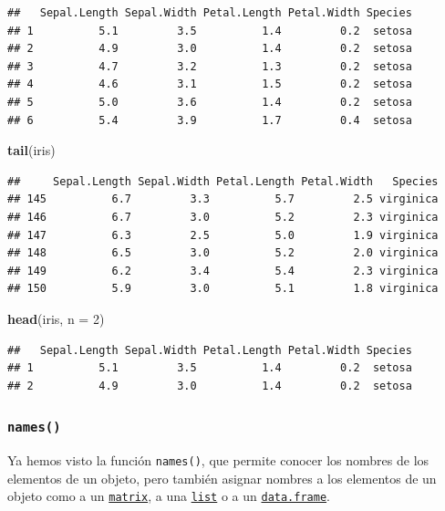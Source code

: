 \documentclass[]{book}
\newenvironment{Shaded}{\begin{snugshade}}{\end{snugshade}}
\newcommand{\KeywordTok}[1]{\textcolor[rgb]{0.13,0.29,0.53}{\textbf{#1}}}
\newcommand{\DataTypeTok}[1]{\textcolor[rgb]{0.13,0.29,0.53}{#1}}
\newcommand{\DecValTok}[1]{\textcolor[rgb]{0.00,0.00,0.81}{#1}}
\newcommand{\NormalTok}[1]{#1}
\begin{document}
\begin{verbatim}
##   Sepal.Length Sepal.Width Petal.Length Petal.Width Species
## 1          5.1         3.5          1.4         0.2  setosa
## 2          4.9         3.0          1.4         0.2  setosa
## 3          4.7         3.2          1.3         0.2  setosa
## 4          4.6         3.1          1.5         0.2  setosa
## 5          5.0         3.6          1.4         0.2  setosa
## 6          5.4         3.9          1.7         0.4  setosa
\end{verbatim}

\begin{Shaded}
\begin{Highlighting}[]
\KeywordTok{tail}\NormalTok{(iris)}
\end{Highlighting}
\end{Shaded}

\begin{verbatim}
##     Sepal.Length Sepal.Width Petal.Length Petal.Width   Species
## 145          6.7         3.3          5.7         2.5 virginica
## 146          6.7         3.0          5.2         2.3 virginica
## 147          6.3         2.5          5.0         1.9 virginica
## 148          6.5         3.0          5.2         2.0 virginica
## 149          6.2         3.4          5.4         2.3 virginica
## 150          5.9         3.0          5.1         1.8 virginica
\end{verbatim}

\begin{Shaded}
\begin{Highlighting}[]
\KeywordTok{head}\NormalTok{(iris, }\DataTypeTok{n =} \DecValTok{2}\NormalTok{)}
\end{Highlighting}
\end{Shaded}

\begin{verbatim}
##   Sepal.Length Sepal.Width Petal.Length Petal.Width Species
## 1          5.1         3.5          1.4         0.2  setosa
## 2          4.9         3.0          1.4         0.2  setosa
\end{verbatim}

\subsubsection{\texorpdfstring{\texttt{names()}}{names()}}\label{l015names}

Ya hemos visto la función \texttt{names()}, que permite conocer los
nombres de los elementos de un objeto, pero también asignar nombres a
los elementos de un objeto como a un
\protect\hyperlink{l014matrix}{\texttt{matrix}}, a una
\protect\hyperlink{l014list}{\texttt{list}} o a un
\protect\hyperlink{l014dataframe}{\texttt{data.frame}}.
\end{document}
